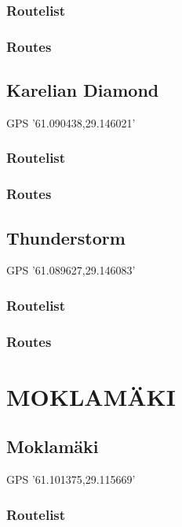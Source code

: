 \documentclass[8pt, a5paper,notitlepage,openany]{report}
\begin{document}
\subsection{Routelist}

\newpage
\subsection{Routes}


\clearpage
 \section{Karelian Diamond}
 GPS '61.090438,29.146021'
\subsection{Routelist}

\newpage
\subsection{Routes}


\clearpage
 \section{Thunderstorm}
 GPS '61.089627,29.146083'
\subsection{Routelist}

\newpage
\subsection{Routes}


\clearpage


\chapter{ MOKLAMÄKI}
\section{Moklamäki}
 GPS '61.101375,29.115669'
\subsection{Routelist}

\newpage
\end{document}
